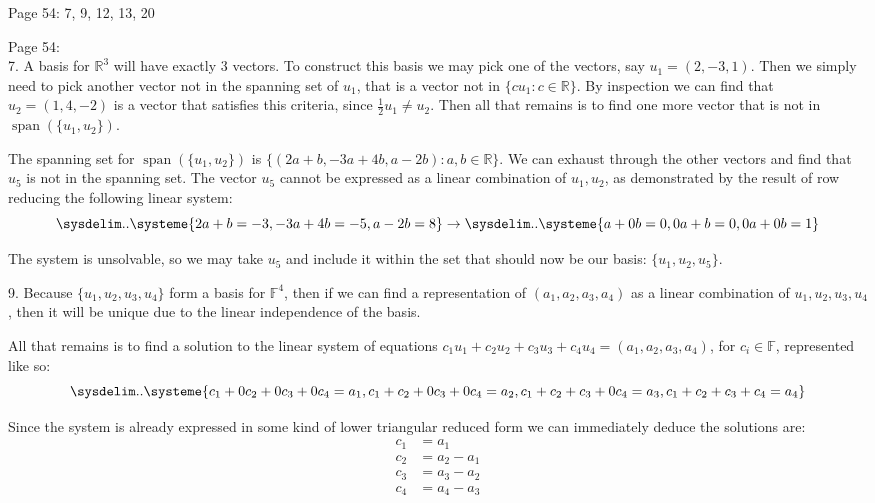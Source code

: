 \documentclass[11pt]{article}
\newcommand{\br}[1]{\left(#1\right)}
\newcommand{\cbr}[1]{\{#1\}}
\DeclareMathOperator{\Span}{span}
\begin{document}
Page 54: 7, 9, 12, 13, 20

Page 54: \\

7. A basis for $\mathbb{R}^3$ will have exactly $3$ vectors. To construct this basis we may pick one of the vectors, say $u_1 = (2,-3,1)$. Then we simply need to pick another vector not in the spanning set of $u_1$, that is a vector not in $\cbr{cu_1 : c \in \mathbb{R}}$. By inspection we can find that $u_2 = (1,4,-2)$ is a vector that satisfies this criteria, since $\frac{1}{2}u_1 \neq u_2$. Then all that remains is to find one more vector that is not in $\Span\br{\cbr{u_1,u_2}}$.

The spanning set for $\Span\br{\cbr{u_1,u_2}}$ is $\cbr{(2a+b, -3a + 4b, a-2b) : a,b\in\mathbb{R}}$. We can exhaust through the other vectors and find that $u_5$ is not in the spanning set. The vector $u_5$ cannot be expressed as a linear combination of $u_1,u_2$, as demonstrated by the result of row reducing the following linear system:
\begin{equation*}
    \sysdelim..\systeme{
    2a + b = -3,
    -3a + 4b = -5,
    a -2b = 8  
    }
    \to
    \sysdelim..\systeme{
    a + 0b = 0,
    0a + b = 0,
    0a + 0b = 1  
    }
\end{equation*}

The system is unsolvable, so we may take $u_5$ and include it within the set that should now be our basis: $\boxed{\cbr{u_1,u_2,u_5}}$.

9. Because $\cbr{u_1,u_2,u_3,u_4}$ form a basis for $\mathbb{F}^4$, then if we can find a representation of $(a_1,a_2,a_3,a_4)$ as a linear combination of $u_1,u_2,u_3,u_4$, then it will be unique due to the linear independence of the basis.

All that remains is to find a solution to the linear system of equations $c_1u_1 + c_2u_2 + c_3u_3 + c_4u_4 = (a_1,a_2,a_3,a_4)$, for $c_i \in \mathbb{F}$, represented like so:
\begin{equation*}
    \sysdelim..\systeme{
    c_1+0c_2+0c_3+0c_4 = a_1,
    c_1+c_2+0c_3+0c_4 = a_2,
    c_1+c_2+c_3+0c_4 = a_3,
    c_1+c_2+c_3+c_4 = a_4
    }
\end{equation*}

Since the system is already expressed in some kind of lower triangular reduced form we can immediately deduce the solutions are:
\begin{align*}
    c_1 &= a_1 \\
    c_2 &= a_2 - a_1 \\
    c_3 &= a_3 - a_2 \\
    c_4 &= a_4 - a_3 \\
\end{align*}
\end{document}
